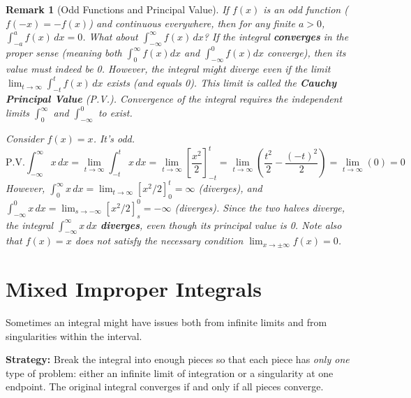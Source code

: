 \documentclass[11pt]{article}
\theoremstyle{mytheoremstyle}
\theoremstyle{mydefinitionstyle}
\newtheorem{remark}[theorem]{Remark}
\begin{document}
\begin{remark}[Odd Functions and Principal Value]
If $f(x)$ is an odd function ($f(-x) = -f(x)$) and continuous everywhere, then for any finite $a > 0$, $\int_{-a}^a f(x) \, dx = 0$.
What about $\int_{-\infty}^\infty f(x) \, dx$?
If the integral \textbf{converges} in the proper sense (meaning both $\int_0^\infty f(x) dx$ and $\int_{-\infty}^0 f(x) dx$ converge), then its value must indeed be 0.
However, the integral might diverge even if the limit $\lim_{t \to \infty} \int_{-t}^t f(x) \, dx$ exists (and equals 0). This limit is called the \textbf{Cauchy Principal Value} (P.V.). Convergence of the integral requires the independent limits $\int_0^\infty$ and $\int_{-\infty}^0$ to exist.

Consider $f(x) = x$. It's odd.
\[ \text{P.V.} \int_{-\infty}^\infty x \, dx = \lim_{t \to \infty} \int_{-t}^t x \, dx = \lim_{t \to \infty} \left[ \frac{x^2}{2} \right]_{-t}^t = \lim_{t \to \infty} \left( \frac{t^2}{2} - \frac{(-t)^2}{2} \right) = \lim_{t \to \infty} (0) = 0 \]
However, $\int_0^\infty x \, dx = \lim_{t \to \infty} [x^2/2]_0^t = \infty$ (diverges), and $\int_{-\infty}^0 x \, dx = \lim_{s \to -\infty} [x^2/2]_s^0 = -\infty$ (diverges). Since the two halves diverge, the integral $\int_{-\infty}^\infty x \, dx$ \textbf{diverges}, even though its principal value is 0. Note also that $f(x)=x$ does not satisfy the necessary condition $\lim_{x\to\pm\infty} f(x)=0$.
\end{remark}

\section{Mixed Improper Integrals}

Sometimes an integral might have issues both from infinite limits and from singularities within the interval.

\textbf{Strategy:} Break the integral into enough pieces so that each piece has \emph{only one} type of problem: either an infinite limit of integration or a singularity at one endpoint. The original integral converges if and only if all pieces converge.
\end{document}
